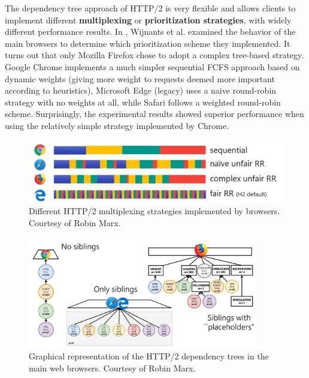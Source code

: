 The dependency tree approach of HTTP/2 is very flexible and allows clients to implement different \textbf{multiplexing} or \textbf{prioritization strategies}, with widely different performance results. In \cite{http2pri}, Wijnants et al. examined the behavior of the main browsers to determine which prioritization scheme they implemented. It turns out that only Mozilla Firefox chose to adopt a complex tree-based strategy. Google Chrome implements a much simpler sequential FCFS approach based on dynamic weights (giving more weight to requests deemed more important according to heuristics), Microsoft Edge (legacy) uses a naive round-robin strategy with no weights at all, while Safari follows a weighted round-robin scheme. Surprisingly, the experimental results showed superior performance when using the relatively simple strategy implemented by Chrome.

\begin{figure}[h]
    \centering
    \includegraphics[width=\textwidth]{res/marx_h2pri_browsers.png}
    \caption{Different HTTP/2 multiplexing strategies implemented by browsers. Courtesy of Robin Marx.\protect\footnotemark}
    \label{fig:marx1}
\end{figure}


\begin{figure}
    \centering
    \includegraphics[width=0.9\textwidth]{res/marx_h2pri_tree.png}
    \caption{Graphical representation of the HTTP/2 dependency trees in the main web browsers. Courtesy of Robin Marx.\protect\footnotemark}
    \label{fig:marx2}
\end{figure}

